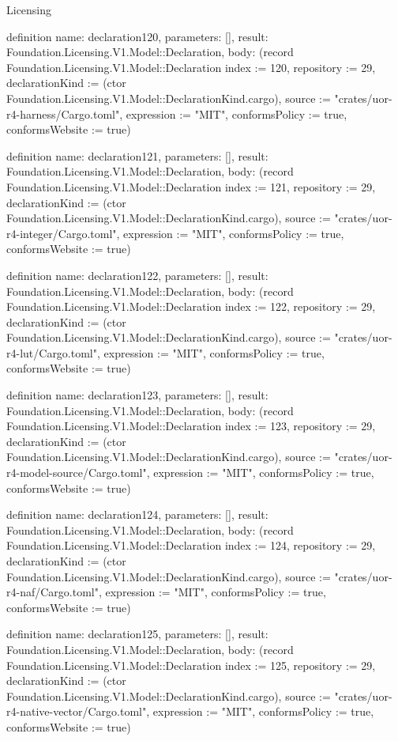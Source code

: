 \begin{lexlean}{Licensing}
\begin{semanticmodule}
definition{
  name: declaration120,
  parameters: [],
  result: Foundation.Licensing.V1.Model::Declaration,
  body: (record Foundation.Licensing.V1.Model::Declaration {index := 120, repository := 29, declarationKind := (ctor Foundation.Licensing.V1.Model::DeclarationKind.cargo), source := "crates/uor-r4-harness/Cargo.toml", expression := "MIT", conformsPolicy := true, conformsWebsite := true})
}

definition{
  name: declaration121,
  parameters: [],
  result: Foundation.Licensing.V1.Model::Declaration,
  body: (record Foundation.Licensing.V1.Model::Declaration {index := 121, repository := 29, declarationKind := (ctor Foundation.Licensing.V1.Model::DeclarationKind.cargo), source := "crates/uor-r4-integer/Cargo.toml", expression := "MIT", conformsPolicy := true, conformsWebsite := true})
}

definition{
  name: declaration122,
  parameters: [],
  result: Foundation.Licensing.V1.Model::Declaration,
  body: (record Foundation.Licensing.V1.Model::Declaration {index := 122, repository := 29, declarationKind := (ctor Foundation.Licensing.V1.Model::DeclarationKind.cargo), source := "crates/uor-r4-lut/Cargo.toml", expression := "MIT", conformsPolicy := true, conformsWebsite := true})
}

definition{
  name: declaration123,
  parameters: [],
  result: Foundation.Licensing.V1.Model::Declaration,
  body: (record Foundation.Licensing.V1.Model::Declaration {index := 123, repository := 29, declarationKind := (ctor Foundation.Licensing.V1.Model::DeclarationKind.cargo), source := "crates/uor-r4-model-source/Cargo.toml", expression := "MIT", conformsPolicy := true, conformsWebsite := true})
}

definition{
  name: declaration124,
  parameters: [],
  result: Foundation.Licensing.V1.Model::Declaration,
  body: (record Foundation.Licensing.V1.Model::Declaration {index := 124, repository := 29, declarationKind := (ctor Foundation.Licensing.V1.Model::DeclarationKind.cargo), source := "crates/uor-r4-naf/Cargo.toml", expression := "MIT", conformsPolicy := true, conformsWebsite := true})
}

definition{
  name: declaration125,
  parameters: [],
  result: Foundation.Licensing.V1.Model::Declaration,
  body: (record Foundation.Licensing.V1.Model::Declaration {index := 125, repository := 29, declarationKind := (ctor Foundation.Licensing.V1.Model::DeclarationKind.cargo), source := "crates/uor-r4-native-vector/Cargo.toml", expression := "MIT", conformsPolicy := true, conformsWebsite := true})
}


\end{semanticmodule}
\end{lexlean}
